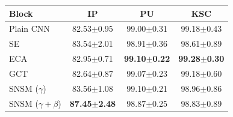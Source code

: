 \begin{tabular}{lccc}
\toprule
Block & IP & PU & KSC \\
\midrule
Plain CNN & 82.53$\pm$0.95 & 99.00$\pm$0.31 & 99.18$\pm$0.43 \\
SE & 83.54$\pm$2.01 & 98.91$\pm$0.36 & 98.61$\pm$0.89 \\
ECA & 82.95$\pm$0.71 & \textbf{99.10$\pm$0.22} & \textbf{99.28$\pm$0.30} \\
GCT & 82.64$\pm$0.87 & 99.07$\pm$0.23 & 99.18$\pm$0.60 \\
SNSM ($\gamma$) & 83.56$\pm$1.08 & 99.10$\pm$0.21 & 98.96$\pm$0.86 \\
SNSM ($\gamma{+}\beta$) & \textbf{87.45$\pm$2.48} & 98.87$\pm$0.25 & 98.83$\pm$0.89 \\
\bottomrule
\end{tabular}
